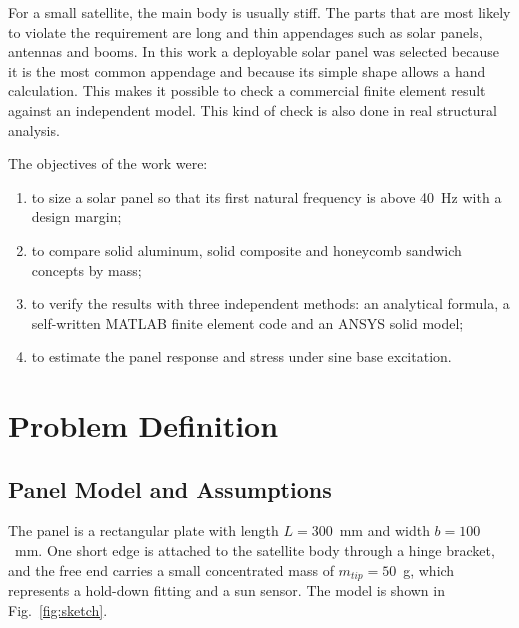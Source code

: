 \documentclass[letterpaper,10pt]{article}
\newcommand{\figref}[1]{Fig.~\ref{#1}}
\begin{document}
For a small satellite, the main body is usually stiff. The parts that are most likely
to violate the requirement are long and thin appendages such as solar panels,
antennas and booms. In this work a deployable solar panel was selected because it is
the most common appendage and because its simple shape allows a hand calculation.
This makes it possible to check a commercial finite element result against an
independent model. This kind of check is also done in real structural analysis.

The objectives of the work were:
\begin{enumerate}[nosep,leftmargin=2.5em]
  \item to size a solar panel so that its first natural frequency is above 40~Hz with a design margin;
  \item to compare solid aluminum, solid composite and honeycomb sandwich concepts by mass;
  \item to verify the results with three independent methods: an analytical formula,
        a self-written MATLAB finite element code and an ANSYS solid model;
  \item to estimate the panel response and stress under sine base excitation.
\end{enumerate}

\section{Problem Definition}

\subsection{Panel Model and Assumptions}

The panel is a rectangular plate with length $L = 300$~mm and width $b = 100$~mm.
One short edge is attached to the satellite body through a hinge bracket, and the
free end carries a small concentrated mass of $m_{tip} = 50$~g, which represents a
hold-down fitting and a sun sensor. The model is shown in \figref{fig:sketch}.
\end{document}
